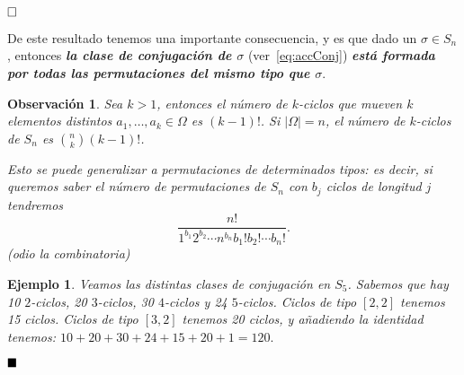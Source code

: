 \documentclass[12pt]{article}
\newtheorem{example}{Ejemplo}[theorem]
\newtheorem{observation}{Observación}[theorem]
\begin{document}
$\hfill \square$

De este resultado tenemos una importante consecuencia, y es que dado un $\sigma \in S_{n}$, entonces \textbf{\textit{la clase de conjugación de $\sigma$}} (ver~\ref{eq:accConj}) \textbf{\textit{está formada por todas las permutaciones del mismo tipo que $\sigma$}}.

\begin{observation} Sea $k>1$, entonces el número de $k$-ciclos que mueven $k$ elementos distintos $a_{1}, \ldots, a_{k} \in \Omega$ es $(k-1)!$. Si $|\Omega| = n$, el número de $k$-ciclos de $S_{n}$ es ${n \choose k} (k-1)!$.

Esto se puede generalizar a permutaciones de determinados tipos: es decir, si queremos saber el número de permutaciones de $S_{n}$ con $b_{j}$ ciclos de longitud $j$ tendremos $$ \dfrac{n!}{1^{b_{1}}2^{b_{2}} \cdots n^{b_{n}}b_{1}!b_{2}!\cdots b_{n}!}.$$(odio la combinatoria)
\end{observation}

\begin{example}
Veamos las distintas clases de conjugación en $S_{5}$. Sabemos que hay 10 $2$-ciclos, 20 $3$-ciclos, 30 $4$-ciclos y 24 $5$-ciclos. Ciclos de tipo $[2,2]$ tenemos 15 ciclos. Ciclos de tipo $[3,2]$ tenemos 20 ciclos, y añadiendo la identidad tenemos: $10+20+30+24+15+20+1 = 120.$
\end{example}

$\hfill \blacksquare$
\end{document}
